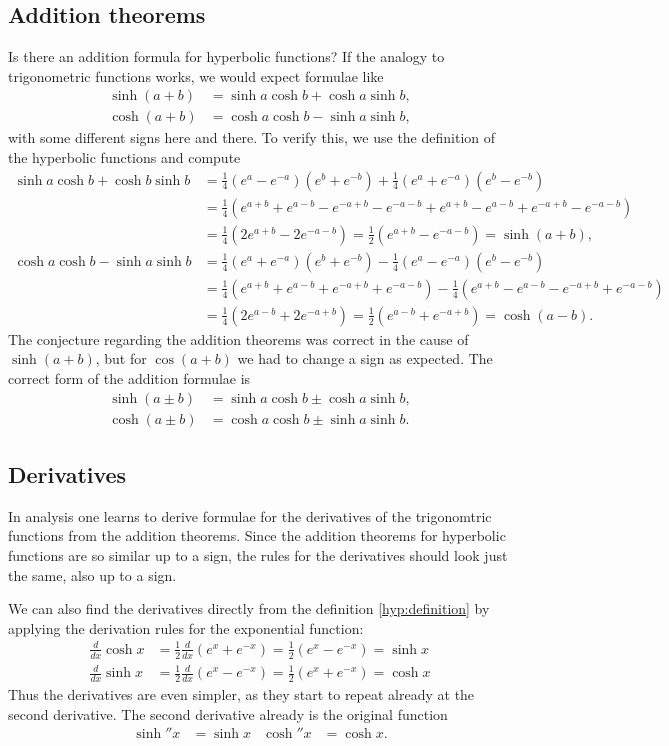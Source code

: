 \subsection{Addition theorems}
Is there an addition formula for hyperbolic functions?
If the analogy to trigonometric functions works, we would expect 
formulae like
\begin{align*}
\sinh(a+b)&=\sinh a\cosh b + \cosh a\sinh b,\\
\cosh(a+b)&=\cosh a\cosh b - \sinh a\sinh b,
\end{align*}
with some different signs here and there.
To verify this, we use the definition of the hyperbolic functions and compute
\begin{align*}
\sinh a\cosh b + \cosh b\sinh b
&=
\frac14(e^a-e^{-a})(e^b+e^{-b})
+
\frac14(e^a+e^{-a})(e^b-e^{-b})
\\
&=\frac14(e^{a+b}+e^{a-b}-e^{-a+b}-e^{-a-b} + e^{a+b}-e^{a-b}+e^{-a+b}-e^{-a-b})
\\
&=
\frac14(2e^{a+b}-2e^{-a-b})
=
\frac12(e^{a+b}-e^{-a-b})=\sinh(a+b),
\\
\cosh a\cosh b-\sinh a\sinh b
&=
\frac14(e^a+e^{-a})(e^b+e^{-b})
-
\frac14(e^a-e^{-a})(e^b-e^{-b})
\\
&=
\frac14(e^{a+b}+e^{a-b}+e^{-a+b}+e^{-a-b})
-
\frac14(e^{a+b}-e^{a-b}-e^{-a+b}+e^{-a-b})
\\
&=
\frac14(2e^{a-b}+2e^{-a+b})
=
\frac12(e^{a-b}+e^{-a+b})=\cosh(a-b).
\end{align*}
The conjecture regarding the addition theorems was correct in the cause
of $\sinh(a+b)$, but for $\cos(a+b)$ we had to change a sign as expected.
The correct form of the addition formulae is
\begin{align*}
\sinh(a\pm b)&=\sinh a\cosh b \pm \cosh a\sinh b,\\
\cosh(a\pm b)&=\cosh a\cosh b \pm \sinh a\sinh b.
\end{align*}

\subsection{Derivatives}
In analysis one learns to derive formulae for the derivatives of the
trigonomtric functions from the addition theorems.
Since the addition theorems for hyperbolic functions are so similar
up to a sign, the rules for the derivatives should look just the
same, also up to a sign.

We can also find the derivatives directly from the definition
\eqref{hyp:definition} by applying the derivation rules for the
exponential function:
\begin{align*}
\frac{d}{dx}\cosh x
&=
\frac12\frac{d}{dx}(e^x+e^{-x})
=
\frac12(e^x-e^{-x})=\sinh x
\\
\frac{d}{dx}\sinh x
&=
\frac12\frac{d}{dx}(e^x-e^{-x})
=
\frac12(e^x+e^{-x})=\cosh x
\end{align*}
Thus the derivatives are even simpler, as they start to repeat already
at the second derivative.
The second derivative already is the original function
\begin{align*}
\sinh''x&=\sinh x
&
\cosh''x&=\cosh x.
\end{align*}

